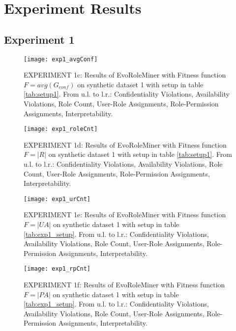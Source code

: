 \chapter{Experiment Results}
\newpage
\section{Experiment 1}
\label{sec:A_Exp1}
		\begin{figure}[H]
			\centering
		    \texttt{[image: exp1\_avgConf]}
		    \caption{EXPERIMENT 1c: Results of EvoRoleMiner with Fitness function $F=avg(G_{conf})$ on synthetic dataset 1 with setup in table \ref{tab:setup1}. From u.l. to l.r.: Confidentiality Violations, Availability Violations, Role Count, User-Role Assignments, Role-Permission Assignments, Interpretability.}
		    \label{fig:exp1_avgConf}
		\end{figure}
		
		\begin{figure}[H]
			\centering
		    \texttt{[image: exp1\_roleCnt]}
		    \caption{EXPERIMENT 1d: Results of EvoRoleMiner with Fitness function $F=|R|$ on synthetic dataset 1 with setup in table \ref{tab:setup1}. From u.l. to l.r.: Confidentiality Violations, Availability Violations, Role Count, User-Role Assignments, Role-Permission Assignments, Interpretability.}
		    \label{fig:exp1_roleCnt}
		\end{figure}
		
		\begin{figure}[H]
			\centering
		    \texttt{[image: exp1\_urCnt]}
		    \caption{EXPERIMENT 1e: Results of EvoRoleMiner with Fitness function $F=|UA|$ on synthetic dataset 1 with setup in table \ref{tab:exp1_setup}. From u.l. to l.r.: Confidentiality Violations, Availability Violations, Role Count, User-Role Assignments, Role-Permission Assignments, Interpretability.}
		    \label{fig:exp1_urCnt}
		\end{figure}
		
		\begin{figure}[H]
		    \centering
		    \texttt{[image: exp1\_rpCnt]}
	    	\caption{EXPERIMENT 1f: Results of EvoRoleMiner with Fitness function $F=|PA|$ on synthetic dataset 1 with setup in table \ref{tab:exp1_setup}. From u.l. to l.r.: Confidentiality Violations, Availability Violations, Role Count, User-Role Assignments, Role-Permission Assignments, Interpretability.}
	    	\label{fig:exp1_rpCnt}
	    \end{figure}
	
